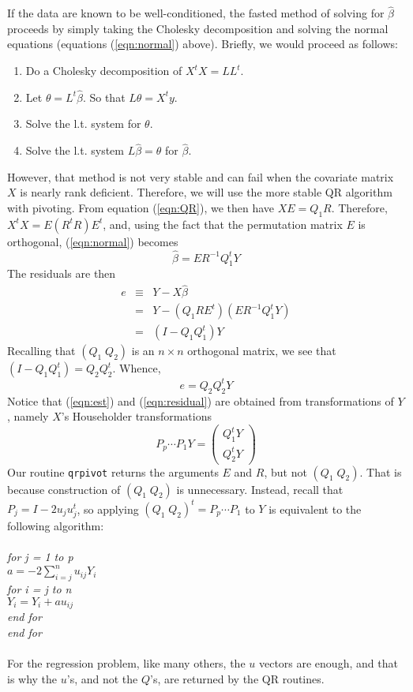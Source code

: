 \documentclass{article}
\begin{document}
If the data are known to be well-conditioned, the fasted method of
solving for $\hat \beta$ proceeds by simply taking the Cholesky
decomposition and solving the
normal equations (equations (\ref{eqn:normal}) above).  Briefly, we
would proceed as follows:
\begin{enumerate}
\item Do a Cholesky decomposition of $X^tX = LL^t$.  
\item Let $\theta = L^t\hat\beta$.  So that $L\theta = X^ty$.  
\item Solve the l.t. system for $\theta$.
\item Solve the l.t. system $L\hat \beta = \theta$ for $\hat \beta$.
\end{enumerate}
However, that method is not very stable and can
fail when the covariate matrix $X$ is nearly rank deficient.
Therefore, we will use the more stable QR algorithm with pivoting.  
From equation
(\ref{eqn:QR}),
we then have
$XE = Q_1R$.  Therefore,
$X^tX = E(R^tR)E^t$, and, using the fact that the permutation matrix
$E$ is orthogonal,
 (\ref{eqn:normal}) becomes
\begin{equation}
\label{eqn:est}
\hat \beta = E R^{-1}Q_1^tY
\end{equation}
The residuals are then
\begin{eqnarray*}
e &\equiv &Y - X\hat \beta\\
& =& Y -  (Q_1RE^t)(E R^{-1}Q_1^tY)\\
& = & (I - Q_1Q_1^t)Y
\end{eqnarray*}
Recalling that $(Q_1 \; Q_2)$ is an $n \times n$ orthogonal matrix, we see that 
$(I - Q_1Q_1^t) = Q_2Q_2^t$.  Whence,
\begin{equation}
\label{eqn:residual} 
e = Q_2Q_2^tY
\end{equation}
Notice that (\ref{eqn:est}) and (\ref{eqn:residual}) are obtained from
transformations of $Y$, namely $X$'s Householder transformations
\[P_p \cdots P_1 Y = \left(\begin{array}{c}
Q_1^t Y \\ Q_2^tY \end{array}\right)\]
Our routine {\tt qrpivot} returns the arguments $E$ and $R$, but not
$(Q_1 \; Q_2)$.  That is because construction of $(Q_1 \; Q_2)$
is unnecessary.
Instead, recall that $P_j = I - 2u_ju_j^t$, so applying $(Q_1 \;
Q_2)^t = P_p \cdots P_1$ to $Y$ is equivalent to the following algorithm:\\\\
\emph{
for j = 1 to p\\
\indent $a = -2 \sum_{i=j}^nu_{ij}Y_i$\\
\indent for i = j to n \\
\indent \indent $Y_i = Y_i + au_{ij}$\\
\indent end for \\
end for
}       
\\\\
For the regression problem, like many others, the $u$ vectors are
enough, and that is why the $u$'s, and not the $Q$'s, are returned by 
the QR routines.
\end{document}
